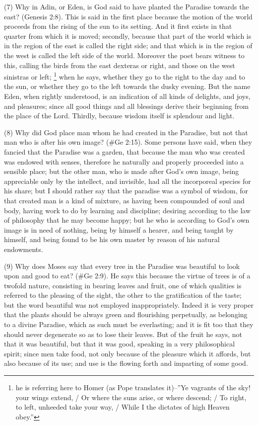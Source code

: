 (7) Why in Adin, or Eden, is God said to have planted the Paradise towards the east? (Genesis
2:8). This is said in the first place because the motion of the world proceeds from the rising of the
sun to its setting. And it first exists in that quarter from which it is moved; secondly, because that
part of the world which is in the region of the east is called the right side; and that which is in the
region of the west is called the left side of the world. Moreover the poet bears witness to this,
calling the birds from the east dexteras or right, and those on the west sinistras or left; \footnote{he is
referring here to Homer (as Pope translates it)--''Ye vagrants of the sky! your wings extend, / Or where the suns arise, or
where descend; / To right, to left, unheeded take your way, / While I the dictates of high Heaven obey.''} when he says,
whether they go to the right to the day and to the sun, or whether they go to the left towards the
dusky evening. But the name Eden, when rightly understood, is an indication of all kinds of delights,
and joys, and pleasures; since all good things and all blessings derive their beginning from the
place of the Lord. Thirdly, because wisdom itself is splendour and light.

(8) Why did God place man whom he had created in the Paradise, but not that man who is after his
own image? (\#Ge 2:15). Some persons have said, when they fancied that the Paradise was a
garden, that because the man who was created was endowed with senses, therefore he naturally
and properly proceeded into a sensible place; but the other man, who is made after God's own
image, being appreciable only by the intellect, and invisible, had all the incorporeal species for his
share; but I should rather say that the paradise was a symbol of wisdom, for that created man is a
kind of mixture, as having been compounded of soul and body, having work to do by learning and
discipline; desiring according to the law of philosophy that he may become happy; but he who is
according to God's own image is in need of nothing, being by himself a hearer, and being taught by
himself, and being found to be his own master by reason of his natural endowments.

(9) Why does Moses say that every tree in the Paradise was beautiful to look upon and good to
eat? (\#Ge 2:9). He says this because the virtue of trees is of a twofold nature, consisting in
bearing leaves and fruit, one of which qualities is referred to the pleasing of the sight, the other to
the gratification of the taste; but the word beautiful was not employed inappropriately. Indeed it is
very proper that the plants should be always green and flourishing perpetually, as belonging to a
divine Paradise, which as such must be everlasting; and it is fit too that they should never
degenerate so as to lose their leaves. But of the fruit he says, not that it was beautiful, but that it
was good, speaking in a very philosophical spirit; since men take food, not only because of the
pleasure which it affords, but also because of its use; and use is the flowing forth and imparting of
some good.

